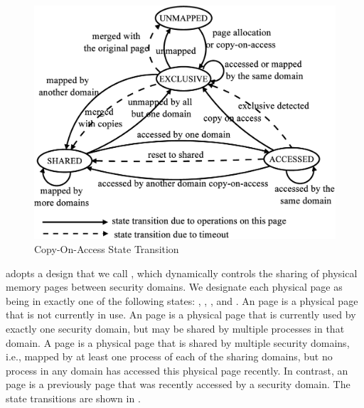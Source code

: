\begin{figure}%
\centering
\includegraphics[width=0.7\linewidth]{fig/cachebar/states.eps}
\caption{Copy-On-Access State Transition\label{fig:coa}}%
\end{figure}

\cachebar adopts a design that we call \coa, which dynamically controls
the sharing of physical memory pages between security domains. We
designate each physical page as being in exactly one of the following
states: \unmapped, \exclusive, \shared, and \accessed.  An \unmapped
page is a physical page that is not currently in use. An \exclusive
page is a physical page that is currently used by exactly one security
domain, but may be shared by multiple processes in that domain.
A \shared page is a physical page that is shared by multiple security
domains, i.e., mapped by at least one process of each of the sharing
domains, but no process in any domain has accessed this physical page
recently. In contrast, an \accessed page is a previously \shared page
that was recently accessed by a security domain.  The state
transitions are shown in .

